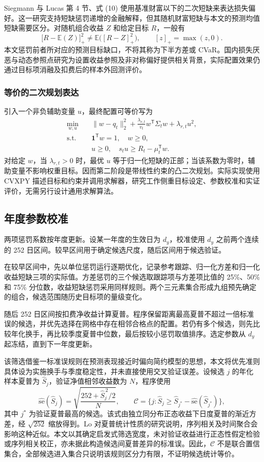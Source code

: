 Siegmann 与 Lucas 第 4 节、式 (10) 使用基准财富以下的二次短缺来表达损失偏好\cite{siegmann2005discrete}。这一研究支持短缺惩罚递增的金融解释，但其随机财富短缺与本文的预测均值短缺需要区分。对随机组合收益 $Z$ 和给定目标 $R$，一般有
\[
\bigl[R-\mathbb E(Z)\bigr]_+^2
\neq\mathbb E\bigl([R-Z]_+^2\bigr),\qquad [z]_+=\max(z,0).
\]
本文惩罚前者所对应的预测目标缺口，不将其称为下半方差或 CVaR。国内损失厌恶与动态参照点研究为设置收益参照及非对称偏好提供相关背景\cite{liu2018lossaverse,wang2021reference}，实际配置效果仍通过目标项消融及扣费后的样本外回测评价。

\subsubsection{等价的二次规划表达}
引入一个非负辅助变量 $u$，最终配置可等价写为
\[
\begin{aligned}
\min_{w,u}\quad &\|w-q_t\|_2^2
+\frac{\lambda_{v,t}}{v_t}w^\mathsf T\Sigma_t w+\lambda_{r,t}u^2,\\
\text{s.t.}\quad &\mathbf1^\mathsf T w=1,\quad w\geq0,\\
&u\geq0,\quad s_tu\geq R_t-\mu_t^\mathsf T w.
\end{aligned}
\]
对给定 $w$，当 $\lambda_{r,t}>0$ 时，最优 $u$ 等于归一化短缺的正部；当该系数为零时，辅助变量不影响权重目标。因而第二阶段是带线性约束的凸二次规划。实际实现使用 CVXPY 描述目标和约束并调用求解器，研究工作侧重目标设定、参数校准和实证评价，无需另行设计通用求解算法。

\subsection{年度参数校准}
两项惩罚系数按年度更新。设某一年度的生效日为 $d_y$，校准使用 $d_y$ 之前两个连续的 252 日区间。较早区间用于确定候选尺度，随后区间用于候选验证。

在较早区间中，先以单位惩罚运行逐期优化，记录参考跟踪、归一化方差和归一化收益短缺三项的实际值。方差惩罚的三个候选取跟踪项与方差项比值的 25\%、50\% 和 75\% 分位数，收益短缺惩罚采用同样规则。两个三元素集合形成九组预先确定的组合，候选范围随历史目标项的量级变化。

随后 252 日区间按扣费净收益计算夏普。程序保留距离最高夏普不超过一倍标准误的候选，并优先选择在网格中存在相邻合格点的配置。若仍有多个候选，则先比较年化换手，再比较季度夏普中位数，最后按较小惩罚取值排序。选定参数从 $d_y$ 起冻结，直到下一年度更新。

该筛选借鉴一标准误规则在预测表现接近时偏向简约模型的思想\cite{hastie2009elements}，本文将优先准则具体设为实施换手与季度稳定性，并未直接使用交叉验证误差。设候选 $j$ 的年化样本夏普为 $\widehat S_j$，验证净值相邻收益数为 $N$，程序使用
\[
\widehat{\mathrm{se}}(\widehat S_j)
=\sqrt{\frac{252+\widehat S_j^{\,2}/2}{N}},\qquad
\mathcal C=\{j:\widehat S_j\geq\widehat S_{j^*}-\widehat{\mathrm{se}}(\widehat S_{j^*})\},
\]
其中 $j^*$ 为验证夏普最高的候选。该式由独立同分布正态收益下日度夏普的渐近方差，经 $\sqrt{252}$ 缩放得到。Lo 对夏普统计性质的研究说明，序列相关及时间聚合会影响这种近似\cite{lo2002statistics}。本文以其确定启发式筛选宽度，未对验证收益进行正态性假定检验或序列相关校正，亦未据此构造候选间夏普差异的标准误。因此，$\mathcal C$ 不是联合置信集合，全部候选进入集合只说明该规则区分力有限，不证明候选统计等价。

